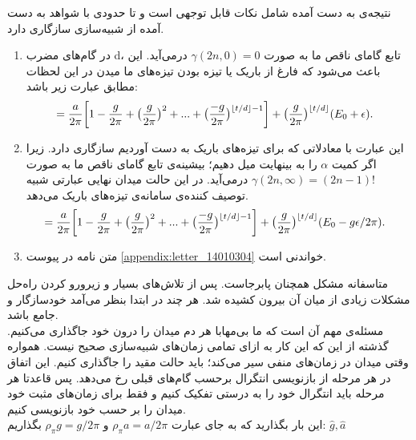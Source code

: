 نتیجه‌ی به دست آمده شامل نکات قابل توجهی است و تا حدودی با شواهد به دست آمده از شبیه‌سازی سازگاری دارد.
\begin{enumerate}
	\item 
	در گام‌های مضرب d، تابع گامای ناقص ما به صورت 
	$ \gamma(2n,0) = 0 $
	درمی‌آید. این باعث می‌شود که فارغ از باریک یا تیزه بودن تیزه‌های ما میدن در این لحظات مطابق 		عبارت زیر باشد:
	\begin{align}
		&= \frac{a}{2\pi} \bigg[ 1 - \frac{g}{2\pi} + \big(\frac{g}{2\pi}\big)^2 + ... + \big(\frac{-g}{2\pi}\big)^{\left\lfloor t/d \right\rfloor - 1} \bigg] + \big(\frac{g}{2\pi}\big)^{\left\lfloor t/d \right\rfloor} (E_0 + \epsilon) .
 	\end{align}
	
	\item 
	این عبارت با معادلاتی که برای تیزه‌های باریک به دست آوردیم سازگاری دارد. زیرا اگر کمیت
	$\alpha$
	را به بینهایت میل دهیم؛ بیشینه‌ی تابع گامای ناقص ما به صورت 
	$ \gamma(2n,\infty) = (2n-1)! $
	درمی‌آید. در این حالت میدان نهایی عبارتی شبیه توصیف ‌کننده‌ی سامانه‌ی تیزه‌های باریک می‌دهد.
	\begin{align}
		&= \frac{a}{2\pi} \bigg[ 1 - \frac{g}{2\pi} + \big(\frac{g}{2\pi}\big)^2 + ... + \big(\frac{-g}{2\pi}\big)^{\left\lfloor t/d \right\rfloor - 1} \bigg] + \big(\frac{g}{2\pi}\big)^{\left\lfloor t/d \right\rfloor} (E_0 - g\epsilon/2\pi) .
	\end{align}
	\item 
	متن نامه‌ در پیوست
	\ref{appendix:letter_14010304}
	خواندنی است.
\end{enumerate}

متاسفانه مشکل همچنان پابرجاست. پس از تلاش‌های بسیار و زیرورو کردن راه‌حل مشکلات زیادی از میان آن بیرون کشیده شد. هر چند در ابتدا بنظر می‌آمد خودسازگار و جامع باشد.\\
مسئله‌ی مهم آن است که ما بی‌مهابا هر دم میدان را درون خود جاگذاری می‌کنیم. گذشته از این که این کار به ازای تمامی زمان‌های شبیه‌سازی صحیح نیست. همواره وقتی میدان در زمان‌های منفی سیر می‌کند؛ باید حالت مقید را جاگذاری کنیم. این اتفاق در هر مرحله از بازنویسی انتگرال برحسب گام‌های قبلی رخ می‌دهد. پس قاعدتا هر مرحله باید انتگرال خود را به درستی تفکیک کنیم و فقط برای زمان‌های مثبت خود میدان را بر حسب خود بازنویسی کنیم.\\
این بار بگذارید که به جای عبارت
$\rho_{\pi} a = a/2\pi$
و
$\rho_{\pi} g =  g/2\pi$
بگذاریم:
$\hat{g}, \hat{a}$

